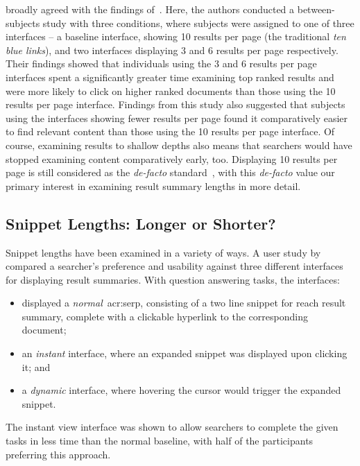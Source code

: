 \cite{kelly2015serp_size} broadly agreed with the findings of~\cite{oulasvirta2009serp_size}. Here, the authors conducted a between-subjects study with three conditions, where subjects were assigned to one of three interfaces -- a baseline interface, showing 10 results per page (the traditional \emph{ten blue links}), and two interfaces displaying 3 and 6 results per page respectively. Their findings showed that individuals using the 3 and 6 results per page interfaces spent a significantly greater time examining top ranked results and were more likely to click on higher ranked documents than those using the 10 results per page interface. Findings from this study also suggested that subjects using the interfaces showing fewer results per page found it comparatively easier to find relevant content than those using the 10 results per page interface. Of course, examining results to shallow depths also means that searchers would have stopped examining content comparatively early, too. Displaying 10 results per page is still considered as the \emph{de-facto} standard~\citep{hearst2009_search}, with this \emph{de-facto} value our primary interest in examining result summary lengths in more detail.

\subsection{Snippet Lengths: Longer or Shorter?}
Snippet lengths have been examined in a variety of ways. A user study by~\cite{paek2004wavelens} compared a searcher's preference and usability against three different interfaces for displaying result summaries. With question answering tasks, the interfaces:

\begin{itemize}
    \item{displayed a \emph{normal}~\gls{acr:serp}, consisting of a two line snippet for reach result summary, complete with a clickable hyperlink to the corresponding document;}
    \item{an \emph{instant} interface, where an expanded snippet was displayed upon clicking it; and}
    \item{a \emph{dynamic} interface, where hovering the cursor would trigger the expanded snippet.}
\end{itemize}

The instant view interface was shown to allow searchers to complete the given tasks in less time than the normal baseline, with half of the participants preferring this approach.

